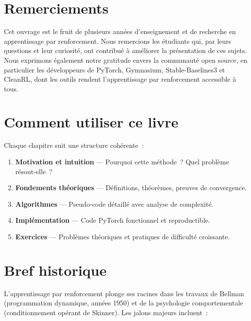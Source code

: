 \section*{Remerciements}

Cet ouvrage est le fruit de plusieurs ann\'ees d'enseignement et de recherche en
apprentissage par renforcement. Nous remercions les \'etudiants qui, par leurs questions
et leur curiosit\'e, ont contribu\'e \`a am\'eliorer la pr\'esentation de ces sujets.
Nous exprimons \'egalement notre gratitude envers la communaut\'e open source, en
particulier les d\'eveloppeurs de PyTorch, Gymnasium, Stable-Baselines3 et CleanRL,
dont les outils rendent l'apprentissage par renforcement accessible \`a tous.

\section*{Comment utiliser ce livre}

\begin{intuition}
Chaque chapitre suit une structure coh\'erente~:
\begin{enumerate}
    \item \textbf{Motivation et intuition} --- Pourquoi cette m\'ethode~? Quel probl\`eme
    r\'esout-elle~?
    \item \textbf{Fondements th\'eoriques} --- D\'efinitions, th\'eor\`emes, preuves de
    convergence.
    \item \textbf{Algorithmes} --- Pseudo-code d\'etaill\'e avec analyse de complexit\'e.
    \item \textbf{Impl\'ementation} --- Code PyTorch fonctionnel et reproductible.
    \item \textbf{Exercices} --- Probl\`emes th\'eoriques et pratiques de difficult\'e
    croissante.
\end{enumerate}
\end{intuition}

\section*{Bref historique}

L'apprentissage par renforcement plonge ses racines dans les travaux de Bellman
(programmation dynamique, ann\'ees 1950) et de la psychologie comportementale
(conditionnement op\'erant de Skinner). Les jalons majeurs incluent~:

